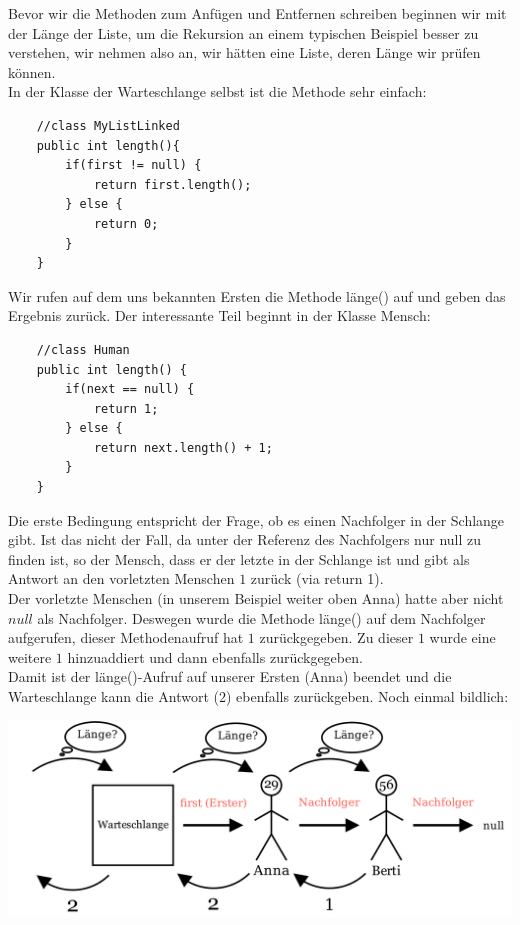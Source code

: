 \documentclass{article}
\begin{document}
Bevor wir die Methoden zum Anfügen und Entfernen schreiben beginnen wir mit der Länge der Liste, um die 
Rekursion an einem typischen Beispiel besser zu verstehen, 
wir nehmen also an, wir hätten eine Liste, deren Länge wir prüfen können. \\
In der Klasse der Warteschlange selbst ist die Methode sehr einfach: 
\begin{verbatim}
    //class MyListLinked
    public int length(){
        if(first != null) {
            return first.length();
        } else {
            return 0;
        }
    }
\end{verbatim}
Wir rufen auf dem uns bekannten Ersten die Methode länge() auf und geben das Ergebnis zurück. Der interessante
Teil beginnt in der Klasse Mensch: 
\begin{verbatim}
    //class Human
    public int length() {
        if(next == null) {
            return 1;
        } else {
            return next.length() + 1;
        }
    }
\end{verbatim}
Die erste Bedingung entspricht der Frage, ob es einen Nachfolger in der Schlange gibt. Ist das nicht der Fall, 
da unter der Referenz des Nachfolgers nur null zu finden ist, so  der Mensch, dass er der letzte in der Schlange 
ist und gibt als Antwort an den vorletzten Menschen $1$ zurück (via return 1). \\
Der vorletzte Menschen (in unserem Beispiel weiter oben Anna) hatte aber nicht $null$ als Nachfolger. 
Deswegen wurde die Methode länge() auf dem Nachfolger aufgerufen, dieser Methodenaufruf hat $1$ zurückgegeben. 
Zu dieser $1$ wurde eine weitere $1$ hinzuaddiert und dann ebenfalls zurückgegeben. \\
Damit ist der länge()-Aufruf auf unserer Ersten (Anna) beendet und die Warteschlange kann die Antwort 
($2$) ebenfalls zurückgeben. Noch einmal bildlich: 
\begin{center}
    \includegraphics[scale = 0.20]{../media/linked_list_length3.png}
\end{center}
\end{document}
